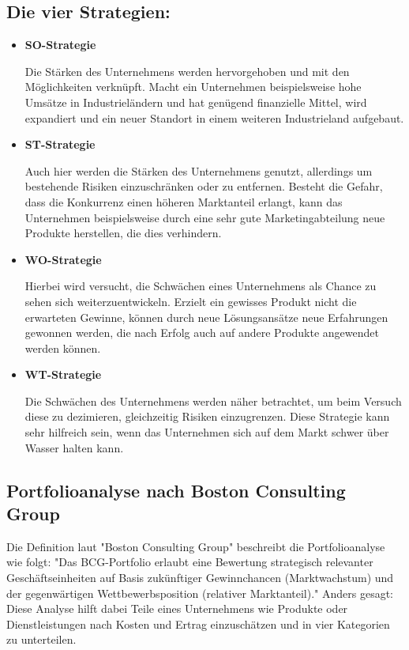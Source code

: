     \subsection*{Die vier Strategien:}
    \begin{itemize}
      \item \textbf{SO-Strategie}

      Die Stärken des Unternehmens werden hervorgehoben und mit den Möglichkeiten verknüpft. Macht ein Unternehmen beispielsweise hohe Umsätze in Industrieländern und hat
      genügend finanzielle Mittel, wird expandiert und ein neuer Standort in einem weiteren Industrieland aufgebaut.

      \item \textbf{ST-Strategie}

      Auch hier werden die Stärken des Unternehmens genutzt, allerdings um bestehende Risiken einzuschränken oder zu entfernen. Besteht die Gefahr, dass die Konkurrenz
      einen höheren Marktanteil erlangt, kann das Unternehmen beispielsweise durch eine sehr gute Marketingabteilung neue Produkte herstellen, die dies verhindern.

      \item \textbf{WO-Strategie}

      Hierbei wird versucht, die Schwächen eines Unternehmens als Chance zu sehen sich weiterzuentwickeln. Erzielt ein gewisses Produkt nicht die erwarteten Gewinne,
      können durch neue Lösungsansätze neue Erfahrungen gewonnen werden, die nach Erfolg auch auf andere Produkte angewendet werden können.

      \item \textbf{WT-Strategie}

      Die Schwächen des Unternehmens werden näher betrachtet, um beim Versuch diese zu dezimieren, gleichzeitig Risiken einzugrenzen. Diese Strategie kann sehr hilfreich
      sein, wenn das Unternehmen sich auf dem Markt schwer über Wasser halten kann.
    \end{itemize}

    \subsection*{Portfolioanalyse nach Boston Consulting Group}
    Die Definition laut {"Boston Consulting Group"\cite{portfolioanalyse}} beschreibt die Portfolioanalyse wie folgt:
    "Das BCG-Portfolio erlaubt eine Bewertung strategisch relevanter Geschäftseinheiten auf Basis zukünftiger Gewinnchancen (Marktwachstum) und der
    gegenwärtigen Wettbewerbsposition (relativer Marktanteil)."
    Anders gesagt: Diese Analyse hilft dabei Teile eines Unternehmens wie Produkte oder Dienstleistungen
    nach Kosten und Ertrag einzuschätzen und in vier Kategorien zu unterteilen.

